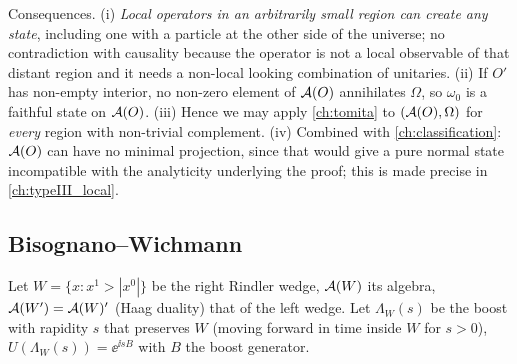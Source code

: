 Consequences. (i) \emph{Local operators in an arbitrarily small region can create any state}, including one with a particle at the other side of the universe; no contradiction with causality because the operator is not a local observable of that distant region and it needs a non-local looking combination of unitaries. (ii) If $O'$ has non-empty interior, no non-zero element of $\mathcal{A}(O)$ annihilates $\Omega$, so $\omega_0$ is a faithful state on $\mathcal{A}(O)$. (iii) Hence we may apply \cref{ch:tomita} to $(\mathcal{A}(O),\Omega)$ for \emph{every} region with non-trivial complement. (iv) Combined with \cref{ch:classification}: $\mathcal{A}(O)$ can have no minimal projection, since that would give a pure normal state incompatible with the analyticity underlying the proof; this is made precise in \cref{ch:typeIII_local}.

\begin{figure}[h]
\centering
{}
\end{figure}

\subsection{Bisognano--Wichmann}

Let $W=\{x:x^1>|x^0|\}$ be the right Rindler wedge, $\mathcal{A}(W)$ its algebra, $\mathcal{A}(W')=\mathcal{A}(W)'$ (Haag duality) that of the left wedge. Let $\Lambda_W(s)$ be the boost with rapidity $s$ that preserves $W$ (moving forward in time inside $W$ for $s>0$), $U(\Lambda_W(s))=\ee^{\ii sB}$ with $B$ the boost generator.

